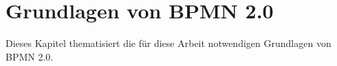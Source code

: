 \chapter{Grundlagen von BPMN 2.0}

Dieses Kapitel thematisiert die für diese Arbeit notwendigen Grundlagen von BPMN 2.0.

